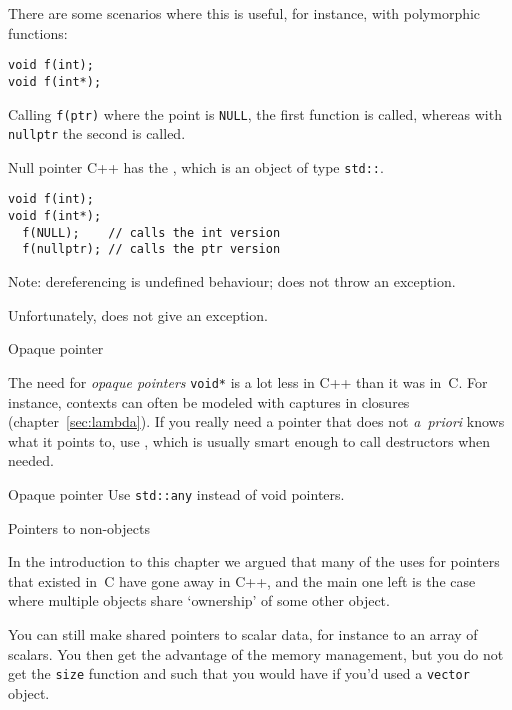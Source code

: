 There are some scenarios where this is useful, for instance, with
polymorphic functions:
\begin{lstlisting}
void f(int);
void f(int*);
\end{lstlisting}
Calling \lstinline{f(ptr)} where the point is \lstinline{NULL}, the first function is
called, whereas with \lstinline{nullptr} the second is called.

\begin{slide}{Null pointer}
  \label{sl:cpp-nullptr}
  C++ has the , which is an object of type
  \lstinline{std::}.

\begin{lstlisting}
void f(int);
void f(int*);
  f(NULL);    // calls the int version
  f(nullptr); // calls the ptr version
\end{lstlisting}
Note: dereferencing is undefined behaviour; does not throw an exception.
\end{slide}

Unfortunately,  does not give an exception.

 {Opaque pointer}

The need for \emph{opaque pointers}
\lstinline{void*}
is a lot less in C++ than it was in~C. For
instance, contexts can often be modeled with captures in closures
(chapter~\ref{sec:lambda}). If you really need a pointer that does not
\textit{a~priori} knows what it points to, use ,
which is usually smart enough to call destructors when needed.


\begin{slide}{Opaque pointer}
  \label{sl:void-ptr}
  Use \lstinline{std::any} instead of void pointers.

\end{slide}

 {Pointers to non-objects}

In the introduction to this chapter we argued that many of the uses
for pointers that existed in~C have gone away in C++, and the main one
left is the case where multiple objects share `ownership' of some
other object.

You can still make shared pointers to scalar data, for instance to an
array of scalars. You then get the advantage of the memory management,
but you do not get the \lstinline{size} function and such that you would have
if you'd used a \lstinline{vector} object.

